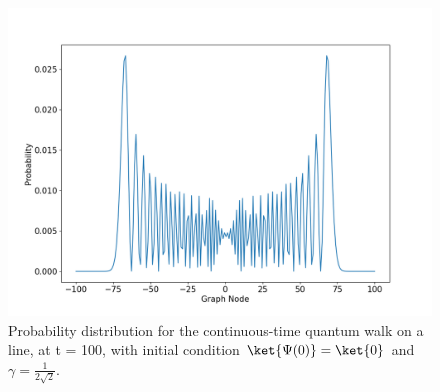                 \begin{figure}[!h]
                    \centering
                    \includegraphics[scale=0.40]{img/ContQuantumWalk/ctqwSinglePsi0.png}
                    \caption{Probability distribution for the continuous-time quantum walk on a line, at t = 100, with initial condition $\ket{\Psi(0)}=\ket{0}$ and $\gamma=\frac{1}{2\sqrt{2}}$.} 
                    \label{fig:contdist0}
                \end{figure}
                
